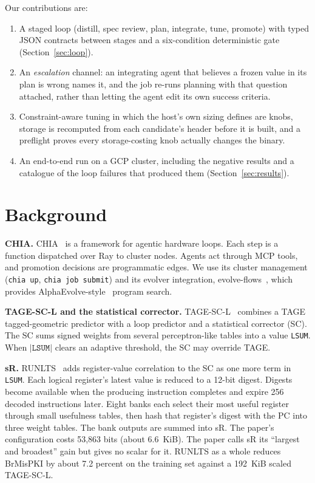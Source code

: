 \documentclass[conference]{IEEEtran}
\begin{document}
Our contributions are:
\begin{enumerate}
\item A staged loop (distill, spec review, plan, integrate, tune, promote) with
typed JSON contracts between stages and a six-condition deterministic gate
(Section~\ref{sec:loop}).
\item An \emph{escalation} channel: an integrating agent that believes a frozen
value in its plan is wrong names it, and the job re-runs planning with that
question attached, rather than letting the agent edit its own success criteria.
\item Constraint-aware tuning in which the host's own sizing defines are
knobs, storage is recomputed from each candidate's header before it is built,
and a preflight proves every storage-costing knob actually changes the binary.
\item An end-to-end run on a GCP cluster, including the negative results and a
catalogue of the loop failures that produced them (Section~\ref{sec:results}).
\end{enumerate}

\section{Background}

\textbf{CHIA.} CHIA~\cite{chia} is a framework for agentic hardware loops.
Each step is a function dispatched over Ray to cluster nodes. Agents act through
MCP tools, and promotion decisions are programmatic edges. We use its cluster
management (\texttt{chia up}, \texttt{chia job submit}) and its evolver
integration, evolve-flows~\cite{evolveflows}, which provides
AlphaEvolve-style~\cite{alphaevolve} program search.

\textbf{TAGE-SC-L and the statistical corrector.} TAGE-SC-L~\cite{tagescl}
combines a TAGE tagged-geometric predictor with a loop predictor and a
statistical corrector (SC). The SC sums signed weights from several
perceptron-like tables into a value \texttt{LSUM}. When $|\texttt{LSUM}|$
clears an adaptive threshold, the SC may override TAGE.

\textbf{sR.} RUNLTS~\cite{runlts} adds register-value correlation to the SC as
one more term in \texttt{LSUM}. Each logical register's latest value is reduced
to a 12-bit digest. Digests become available when the producing instruction
completes and expire 256 decoded instructions later. Eight banks each select
their most useful register through small usefulness tables, then hash that
register's digest with the PC into three weight tables. The bank outputs are
summed into sR. The paper's configuration costs 53,863 bits (about 6.6~KiB).
The paper calls sR its ``largest and broadest'' gain but gives no scalar for it.
RUNLTS as a whole reduces BrMisPKI by about 7.2 percent on the training set
against a 192~KiB scaled TAGE-SC-L.
\end{document}
